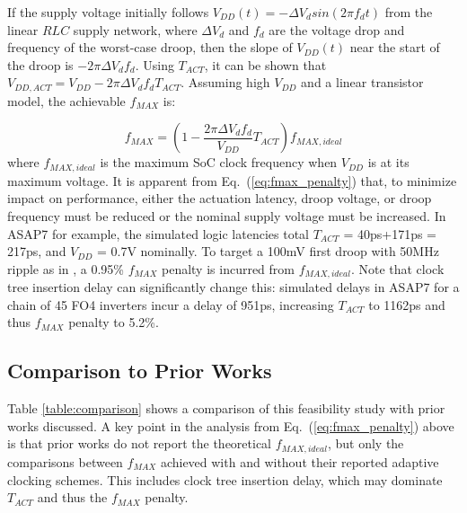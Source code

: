 \documentclass[twoside,9pt,journal,letterpage]{IEEEtran}
\begin{document}
If the supply voltage initially follows $V_{DD}(t) = -\Delta V_{d}sin(2\pi f_{d}t)$ from the linear $RLC$ supply network, where $\Delta V_{d}$ and $f_{d}$ are the voltage drop and frequency of the worst-case droop, then the slope of $V_{DD}(t)$ near the start of the droop is $-2\pi \Delta V_{d}f_{d}$. Using $T_{ACT}$, it can be shown that $V_{DD,ACT} = V_{DD}-2\pi \Delta V_{d}f_{d}T_{ACT}$. Assuming high $V_{DD}$ and a linear transistor model, the achievable $f_{MAX}$ is:

\begin{equation}
\label{eq:fmax_penalty}
f_{MAX} = (1 - \frac{2\pi\Delta V_{d}f_{d}}{V_{DD}}T_{ACT})f_{MAX,ideal}
\end{equation} 
where $f_{MAX,ideal}$ is the maximum SoC clock frequency when $V_{DD}$ is at its maximum voltage. It is apparent from Eq.\ (\ref{eq:fmax_penalty}) that, to minimize impact on performance, either the actuation latency, droop voltage, or droop frequency must be reduced or the nominal supply voltage must be increased. In ASAP7 for example, the simulated logic latencies total $T_{ACT}$ = 40ps+171ps = 217ps, and $V_{DD}$ = 0.7V nominally. To target a 100mV first droop with 50MHz ripple as in \cite{hashimoto2018}, a 0.95\% $f_{MAX}$ penalty is incurred from $f_{MAX,ideal}$. Note that clock tree insertion delay can significantly change this: simulated delays in ASAP7 for a chain of 45 FO4 inverters incur a delay of 951ps, increasing $T_{ACT}$ to 1162ps and thus $f_{MAX}$ penalty to 5.2\%.

\vspace{-5pt}
\subsection{Comparison to Prior Works}
\label{sec:comp-priors}
Table \ref{table:comparison} shows a comparison of this feasibility study with prior works discussed. A key point in the analysis from Eq.\ (\ref{eq:fmax_penalty}) above is that prior works do not report the theoretical $f_{MAX,ideal}$, but only the comparisons between $f_{MAX}$ achieved with and without their reported adaptive clocking schemes. This includes clock tree insertion delay, which may dominate $T_{ACT}$ and thus the $f_{MAX}$ penalty.
\end{document}
